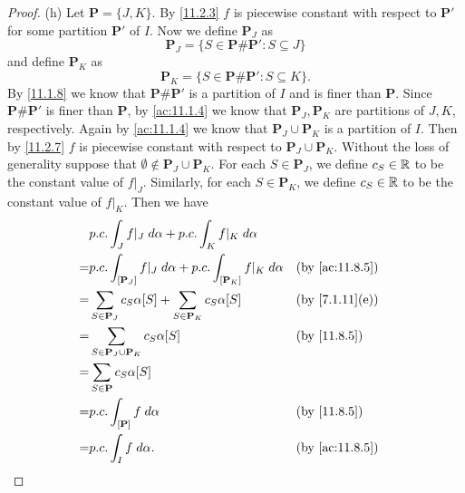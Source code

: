\begin{proof}{(h)}
  Let \(\mathbf{P} = \{J, K\}\).
  By \cref{11.2.3} \(f\) is piecewise constant with respect to \(\mathbf{P}'\) for some partition \(\mathbf{P}'\) of \(I\).
  Now we define \(\mathbf{P}_J\) as
  \[
    \mathbf{P}_J = \{S \in \mathbf{P} \# \mathbf{P}' : S \subseteq J\}
  \]
  and define \(\mathbf{P}_K\) as
  \[
    \mathbf{P}_K = \{S \in \mathbf{P} \# \mathbf{P}' : S \subseteq K\}.
  \]
  By \cref{11.1.8} we know that \(\mathbf{P} \# \mathbf{P}'\) is a partition of \(I\) and is finer than \(\mathbf{P}\).
  Since \(\mathbf{P} \# \mathbf{P}'\) is finer than \(\mathbf{P}\), by \cref{ac:11.1.4} we know that \(\mathbf{P}_J, \mathbf{P}_K\) are partitions of \(J, K\), respectively.
  Again by \cref{ac:11.1.4} we know that \(\mathbf{P}_J \cup \mathbf{P}_K\) is a partition of \(I\).
  Then by \cref{11.2.7} \(f\) is piecewise constant with respect to \(\mathbf{P}_J \cup \mathbf{P}_K\).
  Without the loss of generality suppose that \(\emptyset \notin \mathbf{P}_J \cup \mathbf{P}_K\).
  For each \(S \in \mathbf{P}_J\), we define \(c_S \in \mathbb{R}\) to be the constant value of \(f|_J\).
  Similarly, for each \(S \in \mathbf{P}_K\), we define \(c_S \in \mathbb{R}\) to be the constant value of \(f|_K\).
  Then we have
  \begin{align*}
      & p.c. \int_J f|_J \; d \alpha + p.c. \int_K f|_K \; d \alpha                                                                 \\
    = & p.c. \int_{[\mathbf{P}_J]} f|_J \; d \alpha + p.c. \int_{[\mathbf{P}_K]} f|_K \; d \alpha &  & \text{(by \cref{ac:11.8.5})} \\
    = & \sum_{S \in \mathbf{P}_J} c_S \alpha[S] + \sum_{S \in \mathbf{P}_K} c_S \alpha[S]         &  & \text{(by \cref{7.1.11}(e))} \\
    = & \sum_{S \in \mathbf{P}_J \cup \mathbf{P}_K} c_S \alpha[S]                                 &  & \text{(by \cref{11.8.5})}    \\
    = & \sum_{S \in \mathbf{P}} c_S \alpha[S]                                                                                       \\
    = & p.c. \int_{[\mathbf{P}]} f \; d \alpha                                                    &  & \text{(by \cref{11.8.5})}    \\
    = & p.c. \int_I f \; d \alpha.                                                                &  & \text{(by \cref{ac:11.8.5})}
  \end{align*}
\end{proof}

